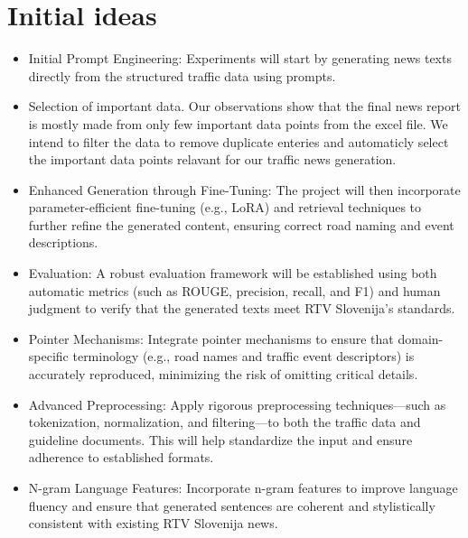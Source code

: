 \documentclass[fleqn,moreauthors,10pt]{ds_report}
\begin{document}
\section{Initial ideas}
\begin{itemize}
    \item Initial Prompt Engineering: Experiments will start by generating news texts directly from the structured traffic data using prompts.
    
    \item Selection of important data. Our observations show that the final news report is mostly made from only few important data points from the excel file. We intend to filter the data to remove duplicate enteries and automaticly select the important data points relavant for our traffic news generation.
    
    \item Enhanced Generation through Fine-Tuning: The project will then incorporate parameter-efficient fine-tuning (e.g., LoRA) and retrieval techniques to further refine the generated content, ensuring correct road naming and event descriptions.
    
    \item Evaluation: A robust evaluation framework will be established using both automatic metrics (such as ROUGE, precision, recall, and F1) and human judgment to verify that the generated texts meet RTV Slovenija’s standards.

    \item Pointer Mechanisms: Integrate pointer mechanisms to ensure that domain-specific terminology (e.g., road names and traffic event descriptors) is accurately reproduced, minimizing the risk of omitting critical details.

    \item Advanced Preprocessing: Apply rigorous preprocessing techniques—such as tokenization, normalization, and filtering—to both the traffic data and guideline documents. This will help standardize the input and ensure adherence to established formats.

    \item N-gram Language Features: Incorporate n-gram features to improve language fluency and ensure that generated sentences are coherent and stylistically consistent with existing RTV Slovenija news.

    \end{itemize}
\end{document}
